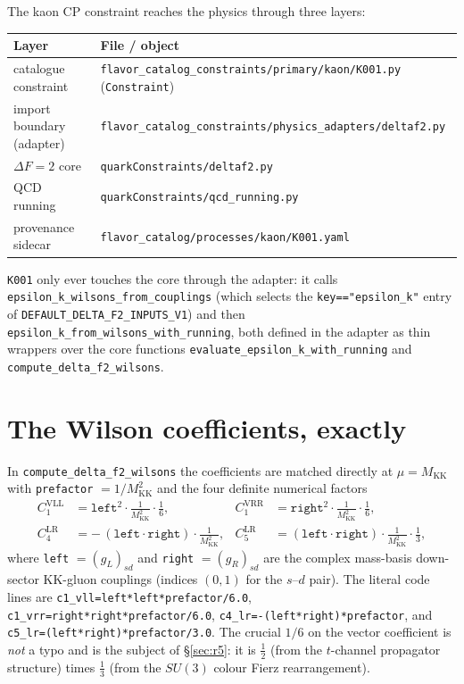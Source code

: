 \documentclass[11pt]{article}
\newcommand{\MKK}{M_{\mathrm{KK}}}
\newcommand{\half}{\tfrac{1}{2}}
\newcommand{\code}[1]{\texttt{#1}}
\theoremstyle{definition}
\begin{document}
The kaon CP constraint reaches the physics through three layers:
\begin{center}
\begin{tabular}{ll}
\toprule
Layer & File / object \\
\midrule
catalogue constraint & \code{flavor\_catalog\_constraints/primary/kaon/K001.py} (\code{Constraint}) \\
import boundary (adapter) & \code{flavor\_catalog\_constraints/physics\_adapters/deltaf2.py} \\
$\Delta F=2$ core & \code{quarkConstraints/deltaf2.py} \\
QCD running & \code{quarkConstraints/qcd\_running.py} \\
provenance sidecar & \code{flavor\_catalog/processes/kaon/K001.yaml} \\
\bottomrule
\end{tabular}
\end{center}
\code{K001} only ever touches the core through the adapter: it calls
\code{epsilon\_k\_wilsons\_from\_couplings} (which selects the \code{key=="epsilon\_k"}
entry of \code{DEFAULT\_DELTA\_F2\_INPUTS\_V1}) and then
\code{epsilon\_k\_from\_wilsons\_with\_running}, both defined in the adapter as thin
wrappers over the core functions \code{evaluate\_epsilon\_k\_with\_running} and
\code{compute\_delta\_f2\_wilsons}.

\section{The Wilson coefficients, exactly}
\label{sec:codewilsons}

In \code{compute\_delta\_f2\_wilsons} the coefficients are matched directly at
$\mu=\MKK$ with \code{prefactor} $=1/\MKK^2$ and the four definite numerical
factors
\begin{align}
C_1^{\mathrm{VLL}} &= \texttt{left}^2 \cdot \tfrac{1}{\MKK^2}\cdot\tfrac{1}{6}, &
C_1^{\mathrm{VRR}} &= \texttt{right}^2 \cdot \tfrac{1}{\MKK^2}\cdot\tfrac{1}{6},
\label{eq:codeC1}\\
C_4^{\mathrm{LR}} &= -\,(\texttt{left}\cdot\texttt{right})\cdot\tfrac{1}{\MKK^2}, &
C_5^{\mathrm{LR}} &= (\texttt{left}\cdot\texttt{right})\cdot\tfrac{1}{\MKK^2}\cdot\tfrac{1}{3},
\label{eq:codeC45}
\end{align}
where \code{left} $=(g_L)_{sd}$ and \code{right} $=(g_R)_{sd}$ are the complex
mass-basis down-sector KK-gluon couplings (indices $(0,1)$ for the $s$--$d$ pair).
The literal code lines are
\code{c1\_vll=left*left*prefactor/6.0},
\code{c1\_vrr=right*right*prefactor/6.0},
\code{c4\_lr=-(left*right)*prefactor}, and
\code{c5\_lr=(left*right)*prefactor/3.0}. The crucial $1/6$ on the vector
coefficient is \emph{not} a typo and is the subject of \S\ref{sec:r5}: it is
$\half$ (from the $t$-channel propagator structure) times $\tfrac13$ (from the
$SU(3)$ colour Fierz rearrangement).
\end{document}
